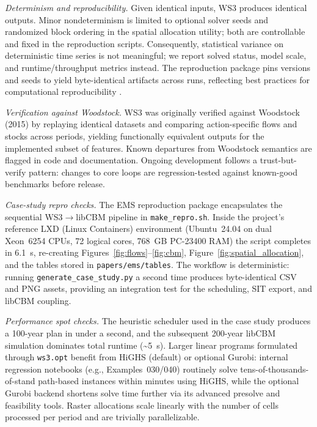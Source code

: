 \documentclass[review]{elsarticle}
\begin{document}
\emph{Determinism and reproducibility.} Given identical inputs, WS3 produces identical outputs. Minor nondeterminism is limited to optional solver seeds and randomized block ordering in the spatial allocation utility; both are controllable and fixed in the reproduction scripts. Consequently, statistical variance on deterministic time series is not meaningful; we report solved status, model scale, and runtime/throughput metrics instead. The reproduction package pins versions and seeds to yield byte-identical artifacts across runs, reflecting best practices for computational reproducibility \citep{peng2011reproducible}.

\emph{Verification against Woodstock.} WS3 was originally verified against Woodstock (2015) by replaying identical datasets and comparing action-specific flows and stocks across periods, yielding functionally equivalent outputs for the implemented subset of features. Known departures from Woodstock semantics are flagged in code and documentation. Ongoing development follows a trust-but-verify pattern: changes to core loops are regression-tested against known-good benchmarks before release.

\emph{Case-study repro checks.} The EMS reproduction package encapsulates the sequential WS3$\to$libCBM pipeline in \texttt{make\_repro.sh}. Inside the project’s reference LXD (Linux Containers) environment (Ubuntu~24.04 on dual Xeon~6254 CPUs, 72 logical cores, 768~GB PC-23400 RAM) the script completes in 6.1~s, re-creating Figures~\ref{fig:flows}--\ref{fig:cbm}, Figure~\ref{fig:spatial_allocation}, and the tables stored in \texttt{papers/ems/tables}. The workflow is deterministic: running \texttt{generate\_case\_study.py} a second time produces byte-identical CSV and PNG assets, providing an integration test for the scheduling, SIT export, and libCBM coupling.

\emph{Performance spot checks.} The heuristic scheduler used in the case study produces a 100-year plan in under a second, and the subsequent 200-year libCBM simulation dominates total runtime (\textasciitilde5~s). Larger linear programs formulated through \texttt{ws3.opt} benefit from HiGHS (default) or optional Gurobi: internal regression notebooks (e.g., Examples~030/040) routinely solve tens-of-thousands-of-stand path-based instances within minutes using HiGHS, while the optional Gurobi backend shortens solve time further via its advanced presolve and feasibility tools. Raster allocations scale linearly with the number of cells processed per period and are trivially parallelizable.
\end{document}
